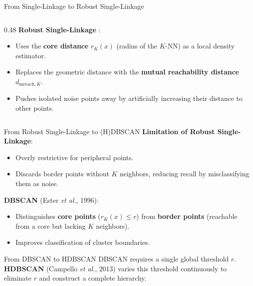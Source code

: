 \documentclass[A4,svgnames,9pt,aspectratio=169]{beamer}
\begin{document}
\begin{frame}{From Single-Linkage to Robust Single-Linkage}
\begin{columns}[c, onlytextwidth]
\begin{column}{0.48\textwidth}
            \vspace{0.4cm}
            \textbf{Robust Single-Linkage} \cite{RobustSingleLinkage2010}:
            \begin{itemize}
                \setlength{\itemsep}{6pt}
                \item Uses the \textbf{core distance} $r_K(x)$ (radius of the $K$-NN) as a local density estimator.
                \item Replaces the geometric distance with the \textbf{mutual reachability distance} $d_{\mathrm{mreach}, K}$.
                \item Pushes isolated noise points away by artificially increasing their distance to other points.
            \end{itemize}
        \end{column}
    \end{columns}
\end{frame}

\begin{frame}{From Robust Single-Linkage to (H)DBSCAN}
    \textbf{Limitation of Robust Single-Linkage}:
    \begin{itemize}
        \setlength{\itemsep}{6pt}
        \item Overly restrictive for peripheral points.
        \item Discards border points without $K$ neighbors, reducing recall by misclassifying them as noise.
    \end{itemize}
    
    \vspace{0.4cm}
    \textbf{DBSCAN} \cite{DBSCAN} (Ester \emph{et al.}, 1996):
    \begin{itemize}
        \setlength{\itemsep}{6pt}
        \item Distinguishes \textbf{core points} ($r_K(x) \le r$) from \textbf{border points} (reachable from a core but lacking $K$ neighbors).
        \item Improves classification of cluster boundaries.
    \end{itemize}
    
    \vspace{0.4cm}
    \begin{block}{From DBSCAN to HDBSCAN}
        DBSCAN requires a single global threshold $r$. 
        \textbf{HDBSCAN} \cite{HDBSCAN} (Campello \emph{et al.}, 2013) varies this threshold continuously to eliminate $r$ and construct a complete hierarchy.
    \end{block}
\end{frame}
\end{document}
